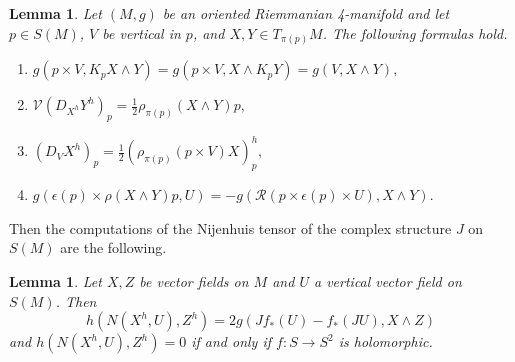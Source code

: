 \documentclass[11pt]{amsart}
\theoremstyle{definition}
\theoremstyle{plain}
\theoremstyle{definition}
\theoremstyle{plain}
\newtheorem{Lemma}[Def]{Lemma}
\theoremstyle{remark}
\theoremstyle{plain}
\begin{document}
\begin{Lemma}
    Let $(M,g)$ be an oriented Riemmanian 4-manifold and let  $p\in S(M)$, $V$  be vertical in $p$, and $X, Y\in T_{\pi(p)}M$. The following formulas hold.
 \begin{enumerate}
 	\item $g(p\times V, K_{p} X \wedge  Y         ) = g(p\times V, X \wedge K_{p} Y         ) = g( V, X \wedge  Y         ),   $ 
 	\item $\mathcal{V}(D_{X^h} Y^h)_{p}= \frac{1}{2} \rho_{\pi(p)}(X \wedge Y) p, $
 	\item $(D_{V} X^h)_{p}= \frac{1}{2} (\rho_{\pi(p)}(p \times V)X)^h_p, $
 	\item $g(\epsilon(p) \times \rho(X \wedge Y) p, U)=-g(\mathcal{R}(p \times \epsilon(p) \times U), X\wedge Y).    $
 \end{enumerate}
\end{Lemma}
Then the computations of the Nijenhuis tensor of  the complex structure $J$ on $S(M)$ are the following.
 \begin{Lemma}
 Let $X,Z$ be vector fields on $M$ and $U$ a vertical vector field on $S(M)$. Then $$ h(N(X^h,U),Z^h) = 2g(  J f_*(U)      - f_*(JU), X \wedge Z)$$ and $h(N(X^h,U),Z^h)=0$  if and only if $f: S\to S^2$  is holomorphic. 
 \end{Lemma}
 
\end{document}

